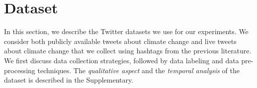 \documentclass[letterpaper]{article}
\begin{document}
\section{Dataset}\label{dataset}
In this section, we describe the Twitter datasets we use for our experiments. We consider both publicly available tweets about climate change and live tweets about climate change that we collect using hashtags from the previous literature. We first discuss data collection strategies, followed by data labeling and data pre-processing techniques. The \textit{qualitative aspect} and the \textit{temporal analysis} of the dataset is described in the Supplementary.

\end{document}
